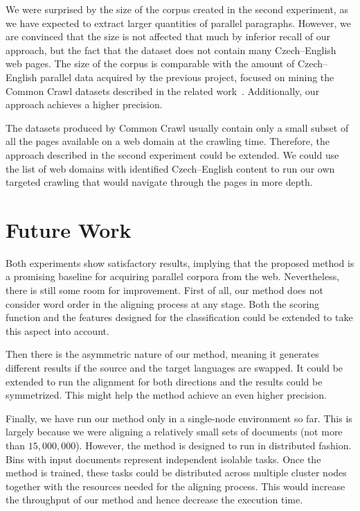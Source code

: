 We were surprised by the size of the corpus created in the second experiment, as we have expected to extract larger quantities of parallel paragraphs. However, we are convinced that the size is not affected that much by inferior recall of our approach, but the fact that the dataset does not contain many Czech--English web pages. The size of the corpus is comparable with the amount of Czech--English parallel data acquired by the previous project, focused on mining the Common Crawl datasets described in the related work~\cite{Smith13}. Additionally, our approach achieves a higher precision. 

The datasets produced by Common Crawl usually contain only a small subset of all the pages available on a web domain at the crawling time. Therefore, the approach described in the second experiment could be extended. We could use the list of web domains with identified Czech--English content to run our own targeted crawling that would navigate through the pages in more depth.

\section*{Future Work}

Both experiments show satisfactory results, implying that the proposed method is a promising baseline for acquiring parallel corpora from the web. Nevertheless, there is still some room for improvement.
First of all, our method does not consider word order in the aligning process at any stage. Both the scoring function and the features designed for the classification could be extended to take this aspect into account.

Then there is the asymmetric nature of our method, meaning it generates different results if the source and the target languages are swapped. It could be extended to run the alignment for both directions and the results could be symmetrized. This might help the method achieve an even higher precision.

Finally, we have run our method only in a single-node environment so far. This is largely because we were aligning a relatively small sets of documents (not more than $15,000,000$).
However, the method is designed to run in distributed fashion. Bins with input documents represent independent isolable tasks. Once the method is trained, these tasks could be distributed across multiple cluster nodes together with the resources needed for the aligning process. This would increase the throughput of our method and hence decrease the execution time.